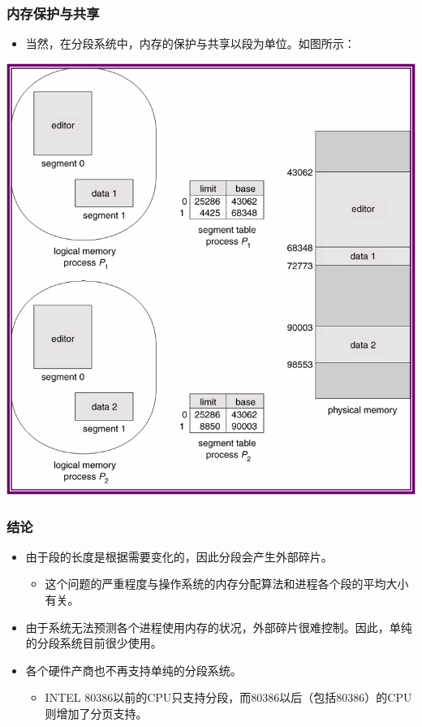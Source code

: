 \documentclass[CJKutf8,xcolor=pdftex,dvipsnames,table]{beamer}
\begin{document}
\begin{CJK*}{UTF8}{song}
  \begin{frame}
  \frametitle{内存保护与共享} \pause
  \begin{itemize}
  \item{当然，在分段系统中，内存的保护与共享以段为单位。如图所示：} \pause
  \end{itemize}
  \begin{center}
    \includegraphics[scale=.5]{v6f9-20}
  \end{center}
  \end{frame}
  
  \begin{frame}
  \frametitle{结论} \pause
  \begin{itemize}
  \item{由于段的长度是根据需要变化的，因此分段会产生外部碎片。} \pause
    \begin{itemize}
    \item{这个问题的严重程度与操作系统的内存分配算法和进程各个段的平均大小有关。} \pause
    \end{itemize}
  \item{由于系统无法预测各个进程使用内存的状况，外部碎片很难控制。因此，单纯的分段系统目前很少使用。} \pause
  \item{各个硬件产商也不再支持单纯的分段系统。} \pause
    \begin{itemize}
    \item{INTEL 80386以前的CPU只支持分段，而80386以后（包括80386）的CPU则增加了分页支持。}
    \end{itemize}
  \end{itemize}
  \end{frame}
  

\end{CJK*}
\end{document}

